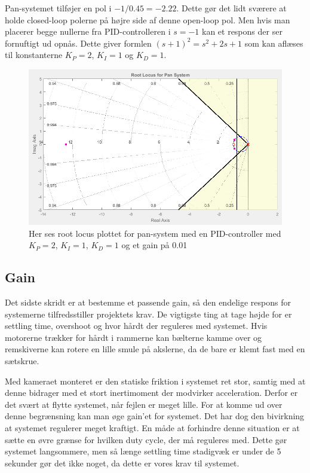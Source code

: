 Pan-systemet tilføjer en pol i $-1/0.45=-2.22$. Dette gør det lidt sværere at holde closed-loop polerne på højre side af denne open-loop pol. Men hvis man placerer begge nullerne fra PID-controlleren i $s=-1$ kan et respons der ser fornuftigt ud opnås. Dette giver formlen $(s+1)^2=s^2+2s+1$ som kan aflæses til konstanterne $K_{P}=2$, $K_{I}=1$ og $K_{D}=1$. 

\begin{figure}[ht]
	\begin{center}
		\includegraphics[scale=0.45]{Billeder/Pan_Rlocus.PNG}
	\end{center}
\caption{Her ses root locus plottet for pan-system med en PID-controller med $K_{P}=2$, $K_{I}=1$, $K_{D}=1$ og et gain på 0.01}
\label{fig:Pan_rlocus}
\end{figure}

\subsection{Gain}

Det sidste skridt er at bestemme et passende gain, så den endelige respons for systemerne tilfredsstiller projektets krav. De vigtigste ting at tage højde for er settling time, overshoot og hvor hårdt der reguleres med systemet. Hvis motorerne trækker for hårdt i rammerne kan bælterne kamme over og remskiverne kan rotere en lille smule på akslerne, da de bare er klemt fast med en sætskrue. 

Med kameraet monteret er den statiske friktion i systemet ret stor, samtig med at denne bidrager med et stort inertimoment der modvirker acceleration. Derfor er det svært at flytte systemet, når fejlen er meget lille. For at komme ud over denne begrænsning kan man øge gain'et for systemet. Det har dog den bivirkning at systemet regulerer meget kraftigt. En måde at forhindre denne situation er at sætte en øvre grænse for hvilken duty cycle, der må reguleres med. Dette gør systemet langsommere, men så længe settling time stadigvæk er under de 5 sekunder gør det ikke noget, da dette er vores krav til systemet.

